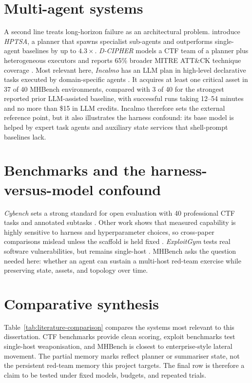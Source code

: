 \documentclass[12pt,oneside]{report}
\begin{document}
\section[Multi-agent orchestration]{Multi-agent systems}
A second line treats long-horizon failure as an architectural problem.
\citet{zhu2024zeroday} introduce \emph{HPTSA}, a planner that spawns specialist
sub-agents and outperforms single-agent baselines by up to $4.3\times$.
\emph{D-CIPHER} models a CTF team of a planner plus heterogeneous executors and
reports 65\% broader MITRE ATT\&CK technique coverage \citep{udeshi2025dcipher}.
Most relevant here, \emph{Incalmo} has an LLM plan in high-level declarative
tasks executed by domain-specific agents \citep{singer2025incalmo}. It acquires
at least one critical asset in 37 of 40 MHBench environments, compared with 3 of
40 for the strongest reported prior LLM-assisted baseline, with successful runs
taking 12--54 minutes and no more than \$15 in LLM credits. Incalmo therefore
sets the external reference point, but it also illustrates the harness confound:
its base model is helped by expert task agents and auxiliary state services that
shell-prompt baselines lack.

\section[Benchmarks and confounds]{Benchmarks and the harness-versus-model confound}
\emph{Cybench} sets a strong standard for open evaluation with 40 professional
CTF tasks and annotated subtasks \citep{zhang2024cybench}. Other work shows that
measured capability is highly sensitive to harness and hyperparameter choices,
so cross-paper comparisons mislead unless the scaffold is held fixed
\citep{offsec2025tuning}. \emph{ExploitGym} tests real software vulnerabilities,
but remains single-host \citep{wang2026exploitgym}. MHBench asks the question
needed here: whether an agent can sustain a multi-host red-team exercise while
preserving state, assets, and topology over time.

\section{Comparative synthesis}
Table~\ref{tab:literature-comparison} compares the systems most relevant to this
dissertation. CTF benchmarks provide clean scoring, exploit benchmarks test
single-host weaponisation, and MHBench is closest to enterprise-style lateral
movement. The partial memory marks reflect planner or summariser state, not the
persistent red-team memory this project targets. The final row is therefore a
claim to be tested under fixed models, budgets, and repeated trials.
\end{document}
